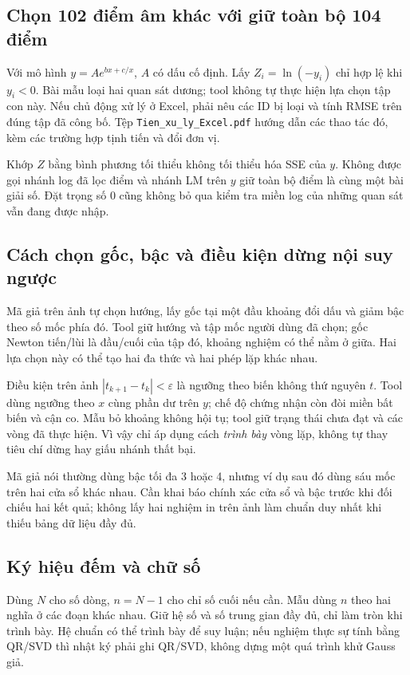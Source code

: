 \subsection{Chọn 102 điểm âm khác với giữ toàn bộ 104 điểm}
Với mô hình $y=Ae^{bx+c/x}$, $A$ có dấu cố định.
Lấy $Z_i=\ln(-y_i)$ chỉ hợp lệ khi $y_i<0$.
Bài mẫu loại hai quan sát dương; tool không tự thực hiện lựa chọn tập con này.
Nếu chủ động xử lý ở Excel, phải nêu các ID bị loại và tính RMSE trên đúng tập đã công bố.
Tệp \texttt{Tien\_xu\_ly\_Excel.pdf} hướng dẫn các thao tác đó, kèm các trường hợp tịnh tiến và đổi đơn vị.

Khớp $Z$ bằng bình phương tối thiểu không tối thiểu hóa SSE của $y$.
Không được gọi nhánh log đã lọc điểm và nhánh LM trên $y$ giữ toàn bộ điểm là cùng một bài giải số.
Đặt trọng số 0 cũng không bỏ qua kiểm tra miền log của những quan sát vẫn đang được nhập.

\subsection{Cách chọn gốc, bậc và điều kiện dừng nội suy ngược}
Mã giả trên ảnh tự chọn hướng, lấy gốc tại một đầu khoảng đổi dấu và giảm bậc theo số mốc phía đó.
Tool giữ hướng và tập mốc người dùng đã chọn; gốc Newton tiến/lùi là đầu/cuối của tập đó, khoảng nghiệm có thể nằm ở giữa.
Hai lựa chọn này có thể tạo hai đa thức và hai phép lặp khác nhau.

Điều kiện trên ảnh $|t_{k+1}-t_k|<\varepsilon$ là ngưỡng theo biến không thứ nguyên $t$.
Tool dùng ngưỡng theo $x$ cùng phần dư trên $y$; chế độ chứng nhận còn đòi miền bất biến và cận co.
Mẫu bỏ khoảng không hội tụ; tool giữ trạng thái chưa đạt và các vòng đã thực hiện.
Vì vậy chỉ áp dụng cách \emph{trình bày} vòng lặp, không tự thay tiêu chí dừng hay giấu nhánh thất bại.

Mã giả nói thường dùng bậc tối đa 3 hoặc 4, nhưng ví dụ sau đó dùng sáu mốc trên hai cửa sổ khác nhau.
Cần khai báo chính xác cửa sổ và bậc trước khi đối chiếu hai kết quả; không lấy hai nghiệm in trên ảnh làm chuẩn duy nhất khi thiếu bảng dữ liệu đầy đủ.

\subsection{Ký hiệu đếm và chữ số}
Dùng $N$ cho số dòng, $n=N-1$ cho chỉ số cuối nếu cần. Mẫu dùng $n$ theo hai nghĩa ở các đoạn khác nhau.
Giữ hệ số và số trung gian đầy đủ, chỉ làm tròn khi trình bày.
Hệ chuẩn có thể trình bày để suy luận; nếu nghiệm thực sự tính bằng QR/SVD thì nhật ký phải ghi QR/SVD, không dựng một quá trình khử Gauss giả.

